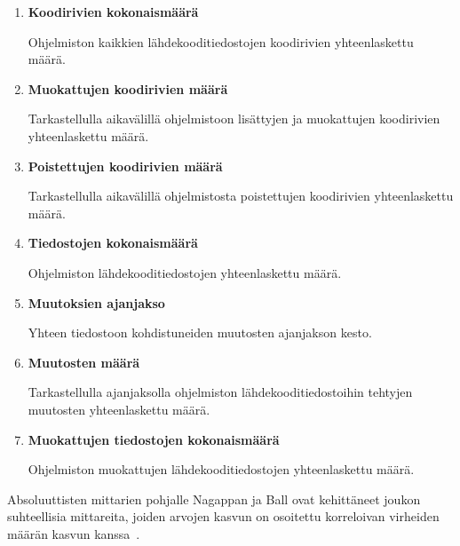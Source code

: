 \documentclass[finnish]{tktltiki2}
\theoremstyle{definition}
\theoremstyle{remark}
\begin{document}
\begin{enumerate}
    \item \textbf{Koodirivien kokonaismäärä}

      Ohjelmiston kaikkien lähdekooditiedostojen koodirivien yhteenlaskettu määrä.
    \item \textbf{Muokattujen koodirivien määrä}

      Tarkastellulla aikavälillä ohjelmistoon lisättyjen ja muokattujen koodirivien yhteenlaskettu määrä.
    \item \textbf{Poistettujen koodirivien määrä}

      Tarkastellulla aikavälillä ohjelmistosta poistettujen koodirivien yhteenlaskettu määrä.
    \item \textbf{Tiedostojen kokonaismäärä}

      Ohjelmiston lähdekooditiedostojen yhteenlaskettu määrä.
    \item \textbf{Muutoksien ajanjakso}

      Yhteen tiedostoon kohdistuneiden muutosten ajanjakson kesto.
    \item \textbf{Muutosten määrä}

      Tarkastellulla ajanjaksolla ohjelmiston lähdekooditiedostoihin tehtyjen muutosten yhteenlaskettu määrä.
    \item \textbf{Muokattujen tiedostojen kokonaismäärä}

      Ohjelmiston muokattujen lähdekooditiedostojen yhteenlaskettu määrä.
\end{enumerate}

Absoluuttisten mittarien pohjalle Nagappan ja Ball ovat kehittäneet joukon suhteellisia mittareita, joiden arvojen kasvun on osoitettu korreloivan virheiden määrän kasvun kanssa~\cite{NB05}.
\end{document}
